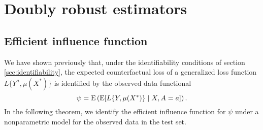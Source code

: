 

\section{Doubly robust estimators} \label{sec:dr}

\subsection{Efficient influence function}
We have shown previously that, under the identifiability conditions of section \ref{sec:identifiability}, the expected counterfactual loss of a generalized loss function $L\{Y^a, \mu(X^*)\}$ is identified by the observed data functional
\begin{equation*}\label{eqn:cl_estimand}
    \psi = \operatorname{E}\left(\operatorname{E}[L\{Y, \mu(X^*)\} \mid X, A=a] \right).
\end{equation*}
In the following theorem, we identify the efficient influence function for $\psi$ under a nonparametric model for the observed data in the test set. 

